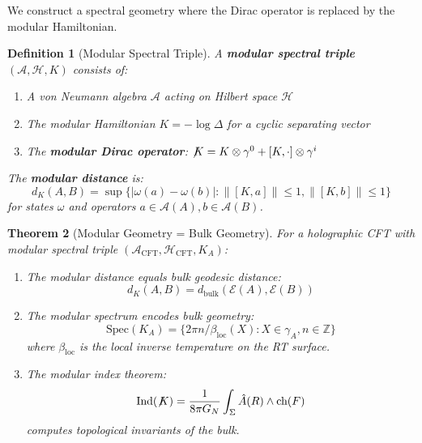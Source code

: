 \documentclass[12pt,a4paper]{article}
\providecommand{\slashed}[1]{\not\!#1}
\newtheorem{theorem}{Theorem}[section]
\newtheorem{definition}[theorem]{Definition}
\begin{document}
We construct a spectral geometry where the Dirac operator is replaced by the modular Hamiltonian.

\begin{definition}[Modular Spectral Triple]\label{def:modular-spectral}
A \textbf{modular spectral triple} $(\mathcal{A}, \mathcal{H}, K)$ consists of:
\begin{enumerate}
    \item A von Neumann algebra $\mathcal{A}$ acting on Hilbert space $\mathcal{H}$
    \item The modular Hamiltonian $K = -\log \Delta$ for a cyclic separating vector
    \item The \textbf{modular Dirac operator}: $\slashed{K} = K \otimes \gamma^0 + [K, \cdot] \otimes \gamma^i$
\end{enumerate}

The \textbf{modular distance} is:
\begin{equation}
d_K(A, B) = \sup\{|\omega(a) - \omega(b)| : \|[K, a]\| \leq 1, \|[K, b]\| \leq 1\}
\end{equation}
for states $\omega$ and operators $a \in \mathcal{A}(A), b \in \mathcal{A}(B)$.
\end{definition}

\begin{theorem}[Modular Geometry = Bulk Geometry]\label{thm:modular-spectral-bulk}
For a holographic CFT with modular spectral triple $(\mathcal{A}_{\text{CFT}}, \mathcal{H}_{\text{CFT}}, K_A)$:
\begin{enumerate}
    \item The modular distance equals bulk geodesic distance:
    \begin{equation}
    d_K(A, B) = d_{\text{bulk}}(\mathcal{E}(A), \mathcal{E}(B))
    \end{equation}
    
    \item The modular spectrum encodes bulk geometry:
    \begin{equation}
    \text{Spec}(K_A) = \{2\pi n/\beta_{\text{loc}}(X) : X \in \gamma_A, n \in \mathbb{Z}\}
    \end{equation}
    where $\beta_{\text{loc}}$ is the local inverse temperature on the RT surface.
    
    \item The modular index theorem:
    \begin{equation}
    \text{Ind}(\slashed{K}) = \frac{1}{8\pi G_N} \int_{\Sigma} \hat{A}(R) \wedge \text{ch}(F)
    \end{equation}
    computes topological invariants of the bulk.
\end{enumerate}
\end{theorem}
\end{document}
